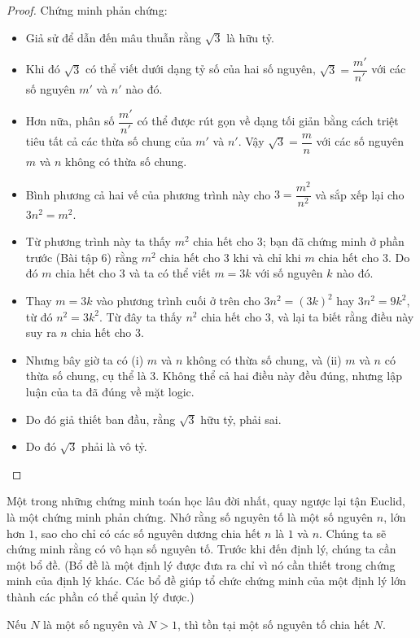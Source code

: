 \begin{proof}
Chứng minh phản chứng:
\begin{itemize}
\item Giả sử để dẫn đến mâu thuẫn rằng $\sqrt{3}$ là hữu tỷ.
\item Khi đó $\sqrt{3}$ có thể viết dưới dạng tỷ số của hai số nguyên, $\sqrt{3} = \dfrac{m'}{n'}$ với các số nguyên $m'$ và $n'$ nào đó.
\item Hơn nữa, phân số $\dfrac{m'}{n'}$ có thể được rút gọn về dạng tối giản bằng cách triệt tiêu tất cả các thừa số chung của $m'$ và $n'$. Vậy $\sqrt{3} = \dfrac{m}{n}$ với các số nguyên $m$ và $n$ không có thừa số chung.
\item Bình phương cả hai vế của phương trình này cho $3 = \dfrac{m^2}{n^2}$ và sắp xếp lại cho $3n^2 = m^2$.
\item Từ phương trình này ta thấy $m^2$ chia hết cho $3$; bạn đã chứng minh ở phần trước (Bài tập 6) rằng $m^2$ chia hết cho $3$ khi và chỉ khi $m$ chia hết cho $3$. Do đó $m$ chia hết cho $3$ và ta có thể viết $m = 3k$ với số nguyên $k$ nào đó.
\item Thay $m = 3k$ vào phương trình cuối ở trên cho $3n^2 = (3k)^2$ hay $3n^2 = 9k^2$, từ đó $n^2 = 3k^2$. Từ đây ta thấy $n^2$ chia hết cho $3$, và lại ta biết rằng điều này suy ra $n$ chia hết cho $3$.
\item Nhưng bây giờ ta có (i) $m$ và $n$ không có thừa số chung, và (ii) $m$ và $n$ có thừa số chung, cụ thể là $3$. Không thể cả hai điều này đều đúng, nhưng lập luận của ta đã đúng về mặt logic.
\item Do đó giả thiết ban đầu, rằng $\sqrt{3}$ hữu tỷ, phải sai.
\item Do đó $\sqrt{3}$ phải là vô tỷ.
\end{itemize}
\end{proof}

Một trong những chứng minh toán học lâu đời nhất, quay ngược lại tận Euclid, là một chứng minh phản chứng. Nhớ rằng số nguyên tố là một số nguyên $n$, lớn hơn $1$, sao cho chỉ có các số nguyên dương chia hết $n$ là $1$ và $n$. Chúng ta sẽ chứng minh rằng có vô hạn số nguyên tố. Trước khi đến định lý, chúng ta cần một bổ đề. (Bổ đề là một định lý được đưa ra chỉ vì nó cần thiết trong chứng minh của định lý khác. Các bổ đề giúp tổ chức chứng minh của một định lý lớn thành các phần có thể quản lý được.)

\begin{lemma}
Nếu $N$ là một số nguyên và $N > 1$, thì tồn tại một số nguyên tố chia hết $N$.
\end{lemma}


